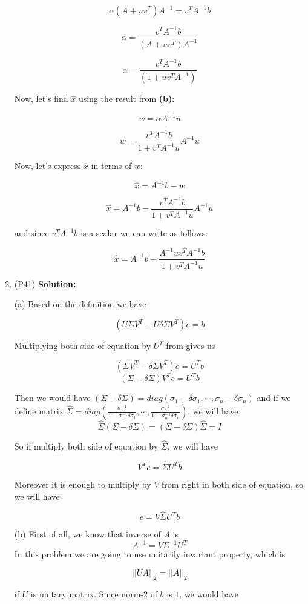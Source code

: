 \documentclass[12pt]{article}
\begin{document}
\begin{enumerate}[leftmargin=\labelsep]
$$\alpha(A + uv^T)A^{-1} = v^TA^{-1}b $$

$$\alpha = \frac{v^TA^{-1}b}{(A + uv^T)A^{-1}} $$

$$\alpha = \frac{v^TA^{-1}b}{(1 + uv^TA^{-1})} $$

Now, let's find $\hat{x}$ using the result from \textbf{(b)}:

$$w = \alpha A^{-1}u$$

$$w = \frac{v^TA^{-1}b}{1 + v^TA^{-1}u}A^{-1}u$$

Now, let's express $\hat{x}$ in terms of $w$:

$$\hat{x} = A^{-1}b - w$$

$$\hat{x} = A^{-1}b - \frac{v^TA^{-1}b}{1 + v^TA^{-1}u}A^{-1}u$$

and since $v^TA^{-1}b$ is a scalar we can write as follows: 

$$\hat{x} = A^{-1}b - \frac{A^{-1}uv^TA^{-1}b}{1 + v^TA^{-1}u}$$
\item (P41)
\textbf{Solution: }

(a) Based on the definition we have

$$(U\Sigma V^T - U\delta \Sigma V^T)e = b$$

Multiplying both side of equation by $U^{T}$ from gives us

$$(\Sigma V^T - \delta \Sigma V^T)e = U^{T}b$$
$$(\Sigma - \delta \Sigma)V^Te = U^{T}b$$

Then we would have $(\Sigma - \delta \Sigma) = diag(\sigma_1 - \delta \sigma_1, \cdots, \sigma_n - \delta \sigma_n)$
and if we define matrix $\hat{\Sigma} = diag(\frac{\sigma_1^{-1}}{1 - \sigma_1^{-1}\delta \sigma_1}, \cdots, \frac{\sigma_n^{-1}}{1 - \sigma_n^{-1}\delta \sigma_n})$, we will have $$\hat{\Sigma}(\Sigma - \delta \Sigma) = (\Sigma - \delta \Sigma)\hat{\Sigma} = I$$

So if multiply both side of equation by $\hat{\Sigma}$, we will have

$$V^Te = \hat{\Sigma}U^{T}b$$

Moreover it is enough to multiply by $V$ from right in both side of equation, so we will have 

$$e = V\hat{\Sigma}U^{T}b$$

(b) First of all, we know that inverse of $A$ is 
$$A^{-1} = V\Sigma^{-1}U^{T}$$
In this problem we are going to use unitarily invariant property, which is

$$||UA||_2 = ||A||_2$$

if $U$ is unitary matrix. Since norm-2 of $b$ is $1$, we would have


\end{enumerate}
\end{document}
